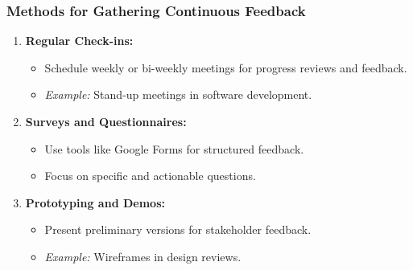 \documentclass[aspectratio=169]{beamer}
\begin{document}
\begin{frame}[fragile]
    \frametitle{Methods for Gathering Continuous Feedback}
    \begin{enumerate}
        \item \textbf{Regular Check-ins:}
            \begin{itemize}
                \item Schedule weekly or bi-weekly meetings for progress reviews and feedback.
                \item \textit{Example:} Stand-up meetings in software development.
            \end{itemize}
        
        \item \textbf{Surveys and Questionnaires:}
            \begin{itemize}
                \item Use tools like Google Forms for structured feedback.
                \item Focus on specific and actionable questions.
            \end{itemize}
        
        \item \textbf{Prototyping and Demos:}
            \begin{itemize}
                \item Present preliminary versions for stakeholder feedback.
                \item \textit{Example:} Wireframes in design reviews.
            \end{itemize}
    \end{enumerate}
\end{frame}
\end{document}

